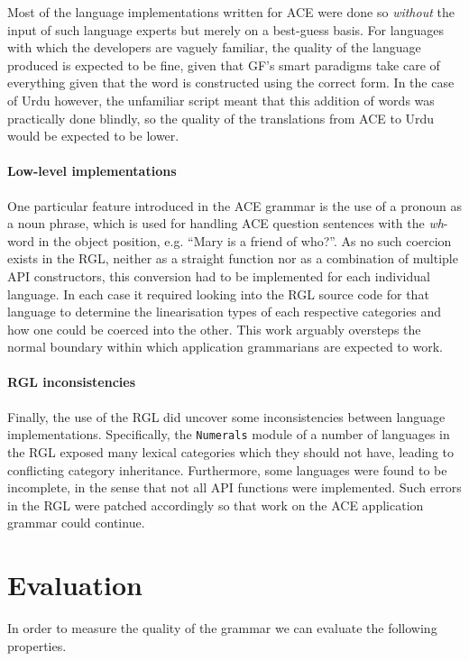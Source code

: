 \documentclass[a4paper]{article}
\begin{document}
Most of the language implementations written for ACE were done so
\emph{without} the input of such language experts but merely on a
best-guess basis. For languages with which the developers are vaguely
familiar, the quality of the language produced is expected to be
fine, given that GF's smart paradigms take care of everything given
that the word is constructed using the correct form. In the case of
Urdu however, the unfamiliar script meant that this addition of words
was practically done blindly, so the quality of the translations from
ACE to Urdu would be expected to be lower.

\paragraph{Low-level implementations}
One particular feature introduced in the ACE grammar is the use of a
pronoun as a noun phrase, which is used for handling ACE question sentences with
the \emph{wh}-word in the object position, e.g. ``Mary is a friend of who?''.
As no such coercion exists in the RGL, neither as 
a straight function nor as a combination of multiple API constructors,
this conversion had to be implemented for each individual language.
In each case it required looking into the RGL source code for that language
to determine the linearisation types of each respective categories
and how one could be coerced into the other.
This work arguably oversteps the normal boundary within which application
grammarians are expected to work.

\paragraph{RGL inconsistencies}
Finally, the use of the RGL did uncover some inconsistencies between
language implementations. Specifically, the \verb|Numerals| module of
a number of languages in the RGL exposed many lexical categories which
they should not have, leading to conflicting category
inheritance. Furthermore, some languages were found to be incomplete,
in the sense that not all API functions were implemented. Such errors
in the RGL were patched accordingly so that work on the ACE
application grammar could continue.


\section{Evaluation}
\label{section:Evaluation}

In order to measure the quality of the grammar we can evaluate the following
properties.
\end{document}
